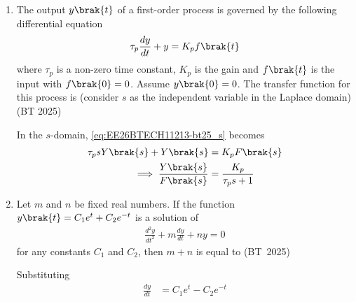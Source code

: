 \begin{enumerate}[label=\thesubsection.\arabic*, ref=\thesubsection.\theenumi,itemsep=0pt]
\begin{figure}[H]
    \label{fig:EE26BTECH11213-bt25_q42}
\end{figure}
\item The output $y\brak{t}$ of a first-order process is governed by the following differential equation
\begin{align}
\tau_p \frac{dy}{dt} + y = K_p f\brak{t}
    \label{eq:EE26BTECH11213-bt25_s}
\end{align}
where $\tau_p$ is a non-zero time constant, $K_p$ is the gain and $f\brak{t}$ is the input with $f\brak{0} = 0$.
Assume $y\brak{0} = 0$. The transfer function for this process is (consider $s$ as the independent variable in the Laplace domain)
\hfill (BT 2025)
\begin{enumerate}[itemsep=1ex]
\end{enumerate}
\solution In the $s$-domain, 
    \eqref{eq:EE26BTECH11213-bt25_s}
    becomes
\begin{align}
\tau_p s Y\brak{s}  + Y\brak{s} &= K_p F\brak{s}
\\
\implies
\frac{Y\brak{s}}{F\brak{s}} &= \frac{K_p}{\tau_p s + 1}
\end{align}
\item Let $m$ and $n$ be fixed real numbers. If the function $y\brak{t} = C_1 e^t + C_2 e^{-t}$ is a solution of
\begin{align}
\frac{d^2 y}{dt^2} + m \frac{dy}{dt} + ny = 0
    \label{eq:EE26BTECH11213-bt25_int-der}
\end{align}
for any constants $C_1$ and $C_2$, then $m + n$ is equal to
\hfill (BT~2025)
\begin{enumerate}[itemsep=0pt]
\end{enumerate}
\solution
Substituting
\begin{align}
\frac{dy}{dt} &= C_1 e^t - C_2 e^{-t} \\

\end{align}
\end{enumerate}
